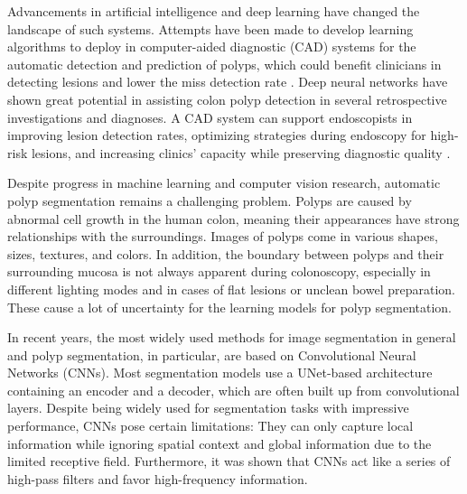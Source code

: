 \documentclass{article}
\begin{document}
Advancements in artificial intelligence and deep learning have changed the landscape of such systems. Attempts have been made to develop learning algorithms to deploy in computer-aided diagnostic (CAD) systems for the automatic detection and prediction of polyps, which could benefit clinicians in detecting lesions and lower the miss detection rate \cite{mesejo2016computer,zhou2019951e,kudo2019artificial}. 
Deep neural networks have shown great potential in assisting colon polyp detection in several retrospective investigations and diagnoses. 
A CAD system can support endoscopists in improving lesion detection rates, optimizing strategies during endoscopy for high-risk lesions, and increasing clinics' capacity while preserving diagnostic quality \cite{chen2018accurate, bisschops2019advanced}.

Despite progress in machine learning and computer vision research, automatic polyp segmentation remains a challenging problem. Polyps are caused by abnormal cell growth in the human colon, meaning their appearances have strong relationships with the surroundings. Images of polyps come in various shapes, sizes, textures, and colors. In addition, the boundary between polyps and their surrounding mucosa is not always apparent during colonoscopy, especially in different lighting modes and in cases of flat lesions or unclean bowel preparation. These cause a lot of uncertainty for the learning models for polyp segmentation.

In recent years, the most widely used methods for image segmentation in general and polyp segmentation, in particular, are based on Convolutional Neural Networks (CNNs). Most segmentation models use a UNet-based architecture containing an encoder and a decoder, which are often built up from convolutional layers. Despite being widely used for segmentation tasks with impressive performance, CNNs pose certain limitations: They can only capture local information while ignoring spatial context and global information due to the limited receptive field. Furthermore, it was shown that CNNs act like a series of high-pass filters and favor high-frequency information.
\end{document}
